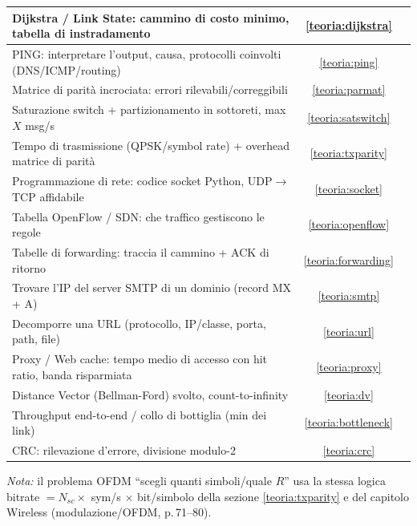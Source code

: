\documentclass[11pt,a4paper]{report}
\begin{document}
\begin{center}
\begin{tabular}{|p{8.4cm}|c|c|}
Dijkstra / Link State: cammino di costo minimo, tabella di instradamento & \ref{teoria:dijkstra} & \pageref{teoria:dijkstra} \\ \hline
PING: interpretare l'output, causa, protocolli coinvolti (DNS/ICMP/routing) & \ref{teoria:ping} & \pageref{teoria:ping} \\ \hline
Matrice di parità incrociata: errori rilevabili/correggibili & \ref{teoria:parmat} & \pageref{teoria:parmat} \\ \hline
Saturazione switch + partizionamento in sottoreti, max $X$ msg/s & \ref{teoria:satswitch} & \pageref{teoria:satswitch} \\ \hline
Tempo di trasmissione (QPSK/symbol rate) + overhead matrice di parità & \ref{teoria:txparity} & \pageref{teoria:txparity} \\ \hline
Programmazione di rete: codice socket Python, UDP$\to$TCP affidabile & \ref{teoria:socket} & \pageref{teoria:socket} \\ \hline
Tabella OpenFlow / SDN: che traffico gestiscono le regole & \ref{teoria:openflow} & \pageref{teoria:openflow} \\ \hline
Tabelle di forwarding: traccia il cammino + ACK di ritorno & \ref{teoria:forwarding} & \pageref{teoria:forwarding} \\ \hline
Trovare l'IP del server SMTP di un dominio (record MX + A) & \ref{teoria:smtp} & \pageref{teoria:smtp} \\ \hline
Decomporre una URL (protocollo, IP/classe, porta, path, file) & \ref{teoria:url} & \pageref{teoria:url} \\ \hline
Proxy / Web cache: tempo medio di accesso con hit ratio, banda risparmiata & \ref{teoria:proxy} & \pageref{teoria:proxy} \\ \hline
Distance Vector (Bellman-Ford) svolto, count-to-infinity & \ref{teoria:dv} & \pageref{teoria:dv} \\ \hline
Throughput end-to-end / collo di bottiglia (min dei link) & \ref{teoria:bottleneck} & \pageref{teoria:bottleneck} \\ \hline
CRC: rilevazione d'errore, divisione modulo-2 & \ref{teoria:crc} & \pageref{teoria:crc} \\ \hline
\end{tabular}
\end{center}
\normalsize
\renewcommand{\arraystretch}{1}

\noindent\emph{Nota:} il problema OFDM ``scegli quanti simboli/quale $R$'' usa la
stessa logica bitrate $=N_{sc}\times$ sym/s $\times$ bit/simbolo della sezione
\ref{teoria:txparity} e del capitolo Wireless (modulazione/OFDM, p.\,71--80).
\end{document}
